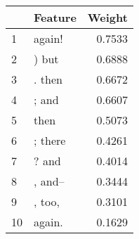 \begin{tabular}{llr}
\toprule
{} &  Feature &  Weight \\
\midrule
1  &   again! &  0.7533 \\
2  &    ) but &  0.6888 \\
3  &   . then &  0.6672 \\
4  &    ; and &  0.6607 \\
5  &     then &  0.5073 \\
6  &  ; there &  0.4261 \\
7  &    ? and &  0.4014 \\
8  &  , and-- &  0.3444 \\
9  &   , too, &  0.3101 \\
10 &   again. &  0.1629 \\
\bottomrule
\end{tabular}
